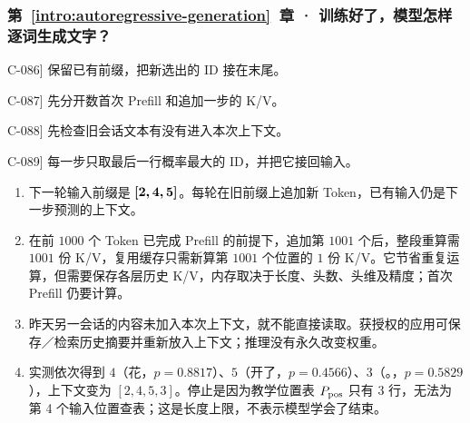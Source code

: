 \subsubsection*{第~\ref*{intro:autoregressive-generation}~章 · 训练好了，模型怎样逐词生成文字？}
\begin{answerhints}
\item[\hyperref[exercise:generation-prefix-append]{C-086}] \leavevmode{}\label{hint:generation-prefix-append}保留已有前缀，把新选出的 ID 接在末尾。
\item[\hyperref[exercise:cached-next-token]{C-087}] \leavevmode{}\label{hint:cached-next-token}先分开数首次 Prefill 和追加一步的 K/V。
\item[\hyperref[exercise:context-window-memory]{C-088}] \leavevmode{}\label{hint:context-window-memory}先检查旧会话文本有没有进入本次上下文。
\item[\hyperref[exercise:greedy-generation]{C-089}] \leavevmode{}\label{hint:greedy-generation}每一步只取最后一行概率最大的 ID，并把它接回输入。
\end{answerhints}
\begin{enumerate}[label={},leftmargin=4.8em,itemsep=4pt]
\item[\textbf{\hyperref[exercise:generation-prefix-append]{C-086.}}] \leavevmode{}\label{solution:C-086}\label{solution:generation-prefix-append}下一轮输入前缀是 $\boldsymbol{[2,4,5]}$。每轮在旧前缀上追加新 Token，已有输入仍是下一步预测的上下文。
\item[\textbf{\hyperref[exercise:cached-next-token]{C-087.}}] \leavevmode{}\label{solution:C-087}\label{solution:cached-next-token}在前 $1000$ 个 Token 已完成 Prefill 的前提下，追加第 $1001$ 个后，整段重算需 $1001$ 份 K/V，复用缓存只需新算第 $1001$ 个位置的 $1$ 份 K/V。它节省重复运算，但需要保存各层历史 K/V，内存取决于长度、头数、头维及精度；首次 Prefill 仍要计算。
\item[\textbf{\hyperref[exercise:context-window-memory]{C-088.}}] \leavevmode{}\label{solution:C-088}\label{solution:context-window-memory}昨天另一会话的内容未加入本次上下文，就不能直接读取。获授权的应用可保存／检索历史摘要并重新放入上下文；推理没有永久改变权重。
\item[\textbf{\hyperref[exercise:greedy-generation]{C-089.}}] \leavevmode{}\label{solution:C-089}\label{solution:greedy-generation}实测依次得到 $4$（花，$p=0.8817$）、$5$（开了，$p=0.4566$）、$3$（。，$p=0.5829$），上下文变为 $[2,4,5,3]$。停止是因为教学位置表 $P_{\rm pos}$ 只有 3 行，无法为第 4 个输入位置查表；这是长度上限，不表示模型学会了结束。
\end{enumerate}
